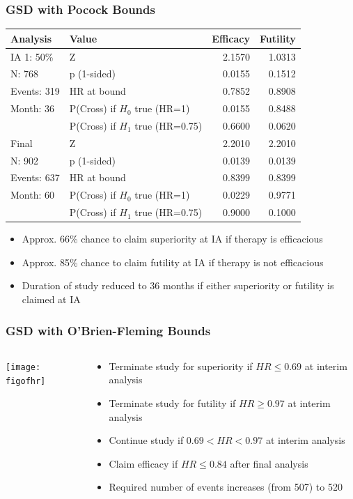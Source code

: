 \documentclass{beamer}
\begin{document}
\begin{frame}
	\frametitle{GSD with Pocock Bounds}
\begin{table}[ht]
	\centering\small
	\begin{tabular}{llrr}
		\hline
		Analysis & Value & Efficacy & Futility \\ 
		\hline
		IA 1: 50\% & Z & 2.1570 & 1.0313 \\ 
		N: 768 & p (1-sided) & 0.0155 & 0.1512 \\ 
		Events: 319 & HR at bound & 0.7852 & 0.8908 \\ 
		Month: 36 & P(Cross) if $H_{0}$ true (HR=1) & 0.0155 & 0.8488 \\ 
		& P(Cross) if $H_{1}$ true (HR=0.75) & 0.6600 & 0.0620 \\ 
		\hline
		Final & Z & 2.2010 & 2.2010 \\ 
		N: 902 & p (1-sided) & 0.0139 & 0.0139 \\ 
		Events: 637 & HR at bound & 0.8399 & 0.8399 \\ 
		Month: 60 & P(Cross) if $H_{0}$ true (HR=1) & 0.0229 & 0.9771 \\ 
		& P(Cross) if $H_{1}$ true (HR=0.75) & 0.9000 & 0.1000 \\ 
		\hline
	\end{tabular}
	\label{tab1}
\end{table}
\begin{itemize}
	\item Approx. 66\% chance to claim superiority at IA if therapy is efficacious
	\item Approx. 85\% chance to claim futility at IA if therapy is not efficacious 
    \item Duration of study reduced to 36 months if either superiority or futility is claimed at IA
\end{itemize}
\end{frame}


\begin{frame}
	\frametitle{GSD with O'Brien-Fleming Bounds}
\begin{columns}
	\begin{column}{0.48\textwidth}
	\texttt{[image: figofhr]} 
	\end{column}
	\begin{column}{0.48\textwidth} \begin{itemize}
			\item Terminate study for superiority if $HR \leq 0.69$ at interim analysis
			\item Terminate study for futility if $HR \geq 0.97$ at interim analysis
			\item Continue study if $ 0.69 < HR < 0.97 $ at interim analysis
			\item Claim efficacy if $HR \leq 0.84$ after final analysis
			\item Required number of events increases (from 507) to 520
		\end{itemize}
	\end{column}
\end{columns}
\end{frame}
\end{document}
